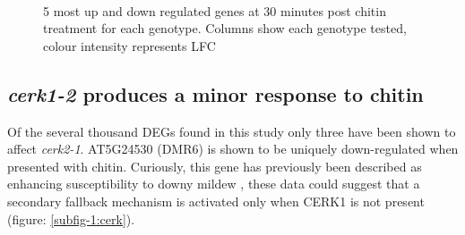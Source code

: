 \documentclass[../main.tex]{subfiles}
\begin{document}
\begin{figure}[!ht]
  \centering
  \\
  \caption{5 most up and down regulated genes at 30 minutes post chitin
    treatment for each genotype. Columns show each genotype tested, colour intensity represents LFC}
  \label{fig:DEG5}
\end{figure}


\subsection{\textit{cerk1-2} produces a minor response to chitin}

Of the several thousand DEGs found in this study only three have been shown to
affect \textit{cerk2-1}. AT5G24530 (DMR6) is shown to be uniquely down-regulated when
presented with chitin. Curiously, this gene has previously been described as
enhancing susceptibility to downy mildew \cite{DOWNYMILDEWRESISTANT}, these data
could suggest that a secondary fallback mechanism is activated only when CERK1 is
not present (figure: \ref{subfig-1:cerk}).
\end{document}
